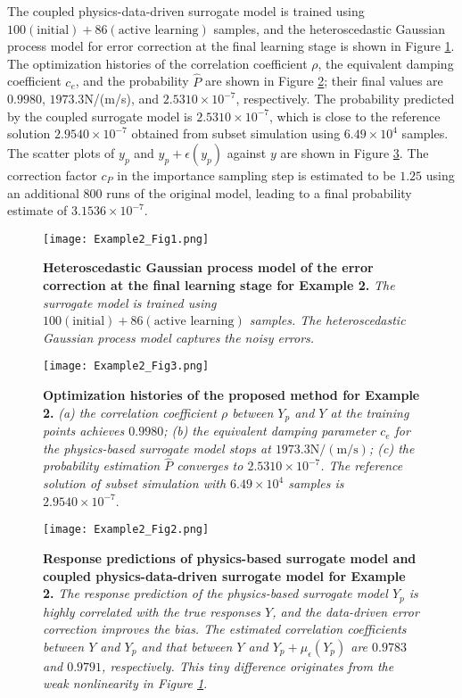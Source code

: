 \documentclass[number,preprint,3p]{elsarticle}
\newcommand{\1}[2]{\mathbb{I}_{#1}\left(#2\right)}
\begin{document}
 The coupled physics-data-driven surrogate model is trained using $100(\text{initial})+86(\text{active learning})$ samples, and the heteroscedastic Gaussian process model for error correction at the final learning stage is shown in Figure \ref{Fig:Example2_fig1}. The optimization histories of the correlation coefficient ${\rho}$, the equivalent damping coefficient $c_{e}$, and the probability $\hat{P}$ are shown in Figure \ref{Fig:Example2_fig2}; their final values are $0.9980$, $1973.3$N/(m/s), and $2.5310\times10^{-7}$, respectively. The probability predicted by the coupled surrogate model is $2.5310\times10^{-7}$, which is close to the reference solution $2.9540\times10^{-7}$ obtained from subset simulation using $6.49\times 10^{4}$ samples. The scatter plots of $y_p$ and $y_p+\epsilon(y_p)$ against $y$ are shown in Figure \ref{Fig:Example2_fig3}. The correction factor $c_P$ in the importance sampling step is estimated to be $1.25$ using an additional $800$ runs of the original model, leading to a final probability estimate of $3.1536\times10^{-7}$.
	
	\begin{figure}[H]
		\centering
		\texttt{[image: Example2\_Fig1.png]}
		\caption{\textbf{Heteroscedastic Gaussian process model of the error correction at the final learning stage for Example 2.} \textit{The surrogate model is trained using $100(\text{initial})+86(\text{active learning})$ samples. The heteroscedastic Gaussian process model captures the noisy errors.}}
		\label{Fig:Example2_fig1}
	\end{figure}
	
	\begin{figure}[H]
		\centering
		\texttt{[image: Example2\_Fig3.png]}
		\caption{\textbf{Optimization histories of the proposed method for Example 2.} \textit{(a) the correlation coefficient ${\rho}$ between $Y_p$ and $Y$ at the training points achieves $0.9980$; (b) the equivalent damping parameter $c_e$ for the physics-based surrogate model stops at $1973.3\mathrm{N/(m/s)}$; (c) the probability estimation $\hat{P}$ converges to $2.5310\times10^{-7}$. The reference solution of subset simulation with $6.49\times10^{4}$ samples is $2.9540\times10^{-7}$}.}
		\label{Fig:Example2_fig2}
	\end{figure}
	
	\begin{figure}[H]
		\centering
		\texttt{[image: Example2\_Fig2.png]}
		\caption{\textbf{Response predictions of physics-based surrogate model and coupled physics-data-driven surrogate model for Example 2.} \textit{The response prediction of the physics-based surrogate model $Y_p$ is highly correlated with the true responses $Y$, and the data-driven error correction improves the bias. The estimated correlation coefficients between $Y$ and $Y_{p}$ and that between $Y$ and $Y_{p}+\mu_{\epsilon}(Y_{p})$ are $0.9783$ and $0.9791$, respectively. This tiny difference originates from the weak nonlinearity in Figure \ref{Fig:Example2_fig1}}.}
		\label{Fig:Example2_fig3}
	\end{figure}
	
\end{document}
